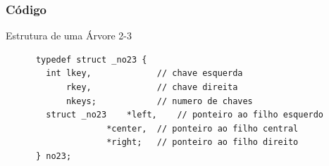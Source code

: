 \documentclass[cyan,compress,aspectratio=43]{beamer}
\begin{document}




\begin{frame}[fragile]
\frametitle{Código}
  \vspace{-0.3cm}
  \begin{block}{Estrutura de uma Árvore 2-3}
     	\begin{lstlisting}
	  typedef struct _no23 {
	    int	lkey,             // chave esquerda
		    rkey,             // chave direita
		    nkeys;            // numero de chaves
	    struct _no23	*left,    // ponteiro ao filho esquerdo 
				    *center,  // ponteiro ao filho central
				    *right;   // ponteiro ao filho direito
	  } no23;   
    	\end{lstlisting}
  \end{block}
\end{frame}
\end{document}
